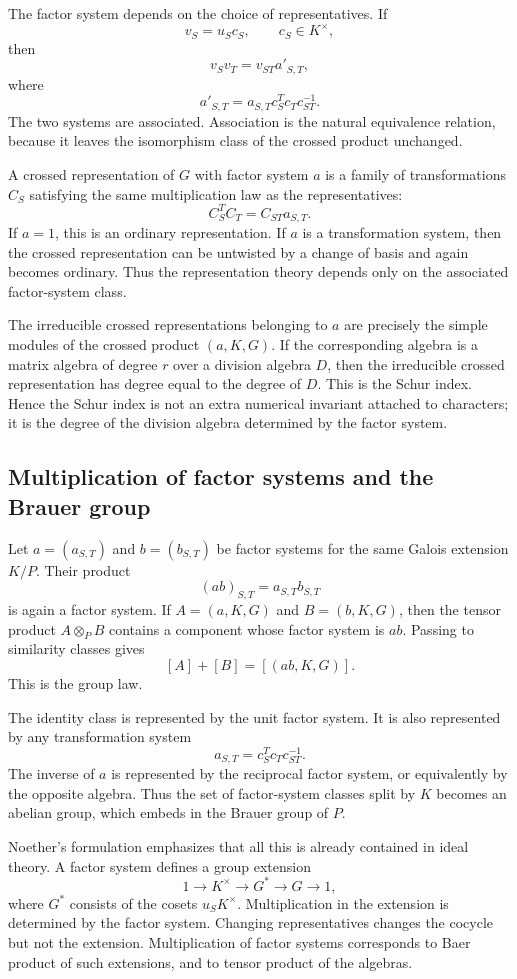\documentclass[11pt]{article}
\begin{document}
The factor system depends on the choice of representatives. If
\[
  v_S=u_Sc_S,
  \qquad c_S\in K^{\times},
\]
then
\[
  v_Sv_T=v_{ST}a'_{S,T},
\]
where
\[
  a'_{S,T}=a_{S,T}c_S^Tc_Tc_{ST}^{-1}.
\]
The two systems are associated. Association is the natural equivalence relation, because it leaves the isomorphism class of the crossed product unchanged.

A crossed representation of \(G\) with factor system \(a\) is a family of transformations \(C_S\) satisfying the same multiplication law as the representatives:
\[
  C_S^T C_T=C_{ST}a_{S,T}.
\]
If \(a=1\), this is an ordinary representation. If \(a\) is a transformation system, then the crossed representation can be untwisted by a change of basis and again becomes ordinary. Thus the representation theory depends only on the associated factor-system class.

The irreducible crossed representations belonging to \(a\) are precisely the simple modules of the crossed product \((a,K,G)\). If the corresponding algebra is a matrix algebra of degree \(r\) over a division algebra \(D\), then the irreducible crossed representation has degree equal to the degree of \(D\). This is the Schur index. Hence the Schur index is not an extra numerical invariant attached to characters; it is the degree of the division algebra determined by the factor system.

\subsection{Multiplication of factor systems and the Brauer group}

Let \(a=(a_{S,T})\) and \(b=(b_{S,T})\) be factor systems for the same Galois extension \(K/P\). Their product
\[
  (ab)_{S,T}=a_{S,T}b_{S,T}
\]
is again a factor system. If \(A=(a,K,G)\) and \(B=(b,K,G)\), then the tensor product \(A\otimes_PB\) contains a component whose factor system is \(ab\). Passing to similarity classes gives
\[
  [A]+[B]=[(ab,K,G)].
\]
This is the group law.

The identity class is represented by the unit factor system. It is also represented by any transformation system
\[
  a_{S,T}=c_S^Tc_Tc_{ST}^{-1}.
\]
The inverse of \(a\) is represented by the reciprocal factor system, or equivalently by the opposite algebra. Thus the set of factor-system classes split by \(K\) becomes an abelian group, which embeds in the Brauer group of \(P\).

Noether's formulation emphasizes that all this is already contained in ideal theory. A factor system defines a group extension
\[
  1\longrightarrow K^{\times}\longrightarrow G^*\longrightarrow G\longrightarrow1,
\]
where \(G^*\) consists of the cosets \(u_SK^{\times}\). Multiplication in the extension is determined by the factor system. Changing representatives changes the cocycle but not the extension. Multiplication of factor systems corresponds to Baer product of such extensions, and to tensor product of the algebras.
\end{document}
